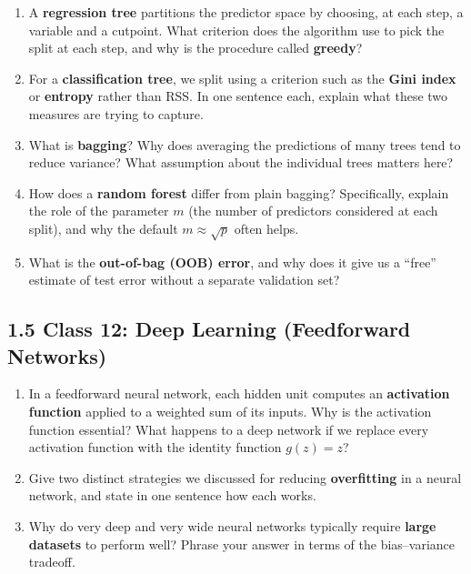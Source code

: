 \documentclass[11pt]{article}
\begin{document}
\begin{enumerate}[leftmargin=*, resume]

\item A \textbf{regression tree} partitions the predictor space by choosing, at each step, a variable and a cutpoint. What criterion does the algorithm use to pick the split at each step, and why is the procedure called \textbf{greedy}?

\item For a \textbf{classification tree}, we split using a criterion such as the \textbf{Gini index} or \textbf{entropy} rather than RSS. In one sentence each, explain what these two measures are trying to capture.

\item What is \textbf{bagging}? Why does averaging the predictions of many trees tend to reduce variance? What assumption about the individual trees matters here?

\item How does a \textbf{random forest} differ from plain bagging? Specifically, explain the role of the parameter $m$ (the number of predictors considered at each split), and why the default $m \approx \sqrt{p}$ often helps.

\item What is the \textbf{out-of-bag (OOB) error}, and why does it give us a ``free'' estimate of test error without a separate validation set?

\end{enumerate}


\subsection*{1.5 Class 12: Deep Learning (Feedforward Networks)}

\begin{enumerate}[leftmargin=*, resume]

\item In a feedforward neural network, each hidden unit computes an \textbf{activation function} applied to a weighted sum of its inputs. Why is the activation function essential? What happens to a deep network if we replace every activation function with the identity function $g(z) = z$?

\item Give two distinct strategies we discussed for reducing \textbf{overfitting} in a neural network, and state in one sentence how each works.

\item Why do very deep and very wide neural networks typically require \textbf{large datasets} to perform well? Phrase your answer in terms of the bias--variance tradeoff.

\end{enumerate}
\end{document}
